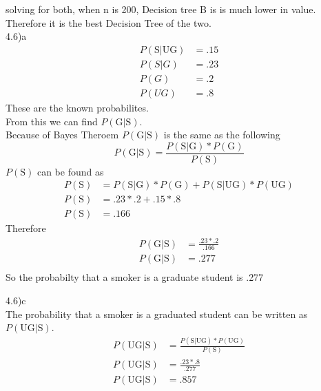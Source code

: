 \documentclass[12pt,english]{article}
\begin{document}
solving for both, when n is 200, Decision tree B is is much lower in value. Therefore it is the best Decision Tree of the two.\\
4.6)a\\
\begin{equation}\tag{1}\label{eq:1}
\begin{split}
P(\mbox{S}\vert \mbox{UG}) &= .15 \\
P(S\vert G) &= .23\\
P(G) &= .2\\
P(UG) &= .8
\end{split}
\end{equation}
These are the known probabilites.\\
 From this we can find $P(\mbox{G}\vert \mbox{S})$.\\
Because of Bayes Theroem  $P(\mbox{G}\vert \mbox{S})$ is the same as the following
\begin{equation}
P(\mbox{G}\vert \mbox{S}) = \frac{P(\mbox{S} \vert \mbox{G}) * P(\mbox{G})}{P(\mbox{S})}
\end{equation}
$P(\mbox{S})$ can be found as
\begin{equation}
\begin{split}
P(\mbox{S}) &=  P(\mbox{S} \vert \mbox{G}) * P(\mbox{G}) + P(\mbox{S} \vert \mbox{UG}) * P(\mbox{UG})\\
P(\mbox{S}) &= .23 *.2 + .15 * .8\\
P(\mbox{S}) &=.166
\end{split}
\end{equation}
Therefore
\begin{equation}
\begin{split}
P(\mbox{G}\vert \mbox{S}) &= \frac{.23 * .2}{.166}\\
P(\mbox{G}\vert \mbox{S}) &= .277\\
\end{split}
\end{equation}
 So the probabilty that a smoker is a graduate student is .277\par
 4.6)c\\
The probability that a smoker is a graduated student  can be written as $P(\mbox{UG}\vert \mbox{S})$.\\
\begin{equation}
\begin{split}
P(\mbox{UG}\vert \mbox{S}) &=  \frac{P(\mbox{S} \vert \mbox{UG}) * P(\mbox{UG})}{P(\mbox{S})}\\
P(\mbox{UG}\vert \mbox{S}) &=\frac{.23 * .8}{.277}\\
P(\mbox{UG}\vert \mbox{S}) &=.857\\
\end{split}
\end{equation}
\end{document}
